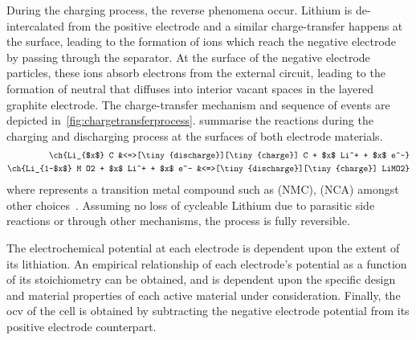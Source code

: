 During  the   charging  process,  the   reverse  phenomena  occur.   Lithium  is
de-intercalated  from  the  positive  electrode and  a  similar  charge-transfer
happens  at the  surface,  leading  to the  formation  of   ions  which
reach  the  negative  electrode  by   passing  through  the  separator.  At  the
surface  of  the  negative  electrode particles,  these  ions  absorb  electrons
from  the  external circuit,  leading  to  the  formation of  neutral  
that   diffuses  into   interior   vacant  spaces   in   the  layered   graphite
electrode. The  charge-transfer mechanism  and sequence  of events  are depicted
in~\cref{fig:chargetransferprocess}.
 summarise the reactions during the
charging and discharging process at the surfaces of both electrode materials.
\begin{align}
    \ch{Li_{$x$} C                            &<=>[\tiny{discharge}][\tiny{charge}] C + $x$ Li^+ + $x$ e^-}\label{eq:NegElectrodeRxn}\\
    \ch{Li_{1-$x$} M O2 + $x$ Li^+  + $x$ e^- &<=>[\tiny{discharge}][\tiny{charge}] LiMO2}\label{eq:PosElectrodeRxn}
\end{align}
where       represents    a    transition   metal    compound   such    as
   (NMC),      (NCA)
amongst other  choices~\cite{Reddy2011}. Assuming  no loss of  cycleable Lithium
due to  parasitic side  reactions or  through other  mechanisms, the  process is
fully reversible.


The electrochemical potential at each electrode  is dependent upon the extent of
its  lithiation. An  empirical  relationship of  each  electrode's potential  as
a  function  of  its  stoichiometry  can be  obtained,  and  is  dependent  upon
the  specific design  and  material  properties of  each  active material  under
consideration. Finally, the \gls{ocv} of the cell is obtained by subtracting the
negative electrode potential from its positive electrode counterpart.


